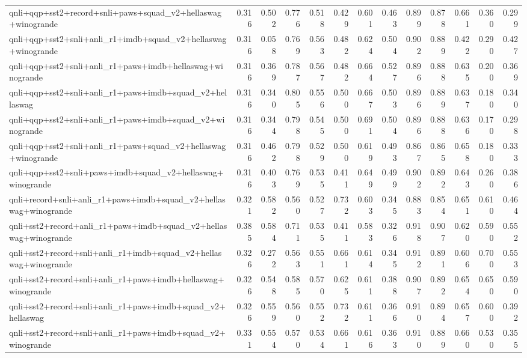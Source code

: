 \begin{table}[t]
\begin{tabular}{lrrrrrrrrrrrr}
    qnli+qqp+sst2+record+snli+paws+squad\_v2+hellaswag+winogrande & 0.316 & 0.502 & 0.776 & 0.518 & 0.429 & 0.601 & 0.463 & 0.899 & 0.878 & 0.661 & 0.360 & 0.299 \\
    qnli+qqp+sst2+snli+anli\_r1+imdb+squad\_v2+hellaswag+winogrande & 0.316 & 0.058 & 0.769 & 0.563 & 0.482 & 0.624 & 0.504 & 0.902 & 0.889 & 0.422 & 0.290 & 0.427 \\
    qnli+qqp+sst2+snli+anli\_r1+paws+imdb+hellaswag+winogrande & 0.316 & 0.369 & 0.787 & 0.567 & 0.482 & 0.664 & 0.527 & 0.896 & 0.888 & 0.635 & 0.200 & 0.369 \\
    qnli+qqp+sst2+snli+anli\_r1+paws+imdb+squad\_v2+hellaswag & 0.316 & 0.340 & 0.805 & 0.556 & 0.500 & 0.667 & 0.503 & 0.896 & 0.889 & 0.637 & 0.180 & 0.340 \\
    qnli+qqp+sst2+snli+anli\_r1+paws+imdb+squad\_v2+winogrande & 0.316 & 0.344 & 0.798 & 0.545 & 0.500 & 0.691 & 0.504 & 0.896 & 0.888 & 0.636 & 0.170 & 0.298 \\
    qnli+qqp+sst2+snli+anli\_r1+paws+squad\_v2+hellaswag+winogrande & 0.316 & 0.462 & 0.798 & 0.529 & 0.500 & 0.619 & 0.493 & 0.867 & 0.865 & 0.658 & 0.180 & 0.333 \\
    qnli+qqp+sst2+snli+paws+imdb+squad\_v2+hellaswag+winogrande & 0.316 & 0.403 & 0.769 & 0.535 & 0.411 & 0.649 & 0.499 & 0.902 & 0.892 & 0.643 & 0.260 & 0.386 \\
    qnli+record+snli+anli\_r1+paws+imdb+squad\_v2+hellaswag+winogrande & 0.321 & 0.582 & 0.560 & 0.527 & 0.732 & 0.603 & 0.345 & 0.883 & 0.854 & 0.651 & 0.610 & 0.464 \\
    qnli+sst2+record+anli\_r1+paws+imdb+squad\_v2+hellaswag+winogrande & 0.385 & 0.584 & 0.711 & 0.535 & 0.411 & 0.583 & 0.326 & 0.918 & 0.907 & 0.620 & 0.590 & 0.552 \\
    qnli+sst2+record+snli+anli\_r1+imdb+squad\_v2+hellaswag+winogrande & 0.326 & 0.272 & 0.563 & 0.551 & 0.661 & 0.614 & 0.345 & 0.912 & 0.891 & 0.606 & 0.700 & 0.553 \\
    qnli+sst2+record+snli+anli\_r1+paws+imdb+hellaswag+winogrande & 0.326 & 0.548 & 0.585 & 0.570 & 0.625 & 0.611 & 0.388 & 0.907 & 0.892 & 0.654 & 0.650 & 0.590 \\
    qnli+sst2+record+snli+anli\_r1+paws+imdb+squad\_v2+hellaswag & 0.326 & 0.559 & 0.560 & 0.552 & 0.732 & 0.611 & 0.366 & 0.910 & 0.894 & 0.657 & 0.600 & 0.392 \\
    qnli+sst2+record+snli+anli\_r1+paws+imdb+squad\_v2+winogrande & 0.331 & 0.554 & 0.570 & 0.534 & 0.661 & 0.616 & 0.363 & 0.910 & 0.889 & 0.660 & 0.530 & 0.355 \\

\end{tabular}
\end{table}
